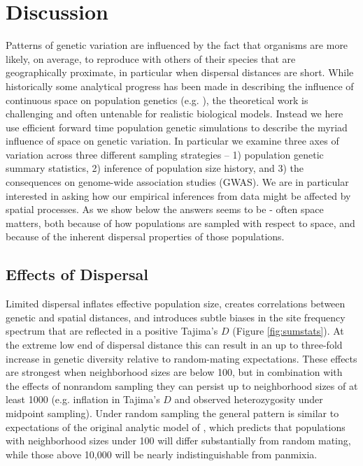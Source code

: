 \documentclass[11pt,twoside,lineno]{preprint}
\begin{document}
\section{Discussion}
Patterns of genetic variation are influenced by the fact that organisms are more likely, on average, to reproduce with others of their species that are geographically proximate, in particular when dispersal distances are short. While historically some analytical progress has been made in describing the influence of continuous space on population genetics (e.g. \cite{Wright1943,Rousset1997,Ringbauer2017,Barton2010}), the theoretical work is challenging and often untenable for realistic biological models. Instead we here use efficient forward time population genetic simulations to describe the myriad influence of space on genetic variation. In particular we examine three axes of variation across three different sampling strategies -- 1) population genetic summary statistics, 2) inference of population size history, and 3) the consequences on genome-wide association studies (GWAS). We are in particular interested in asking how our empirical inferences from data might be affected by spatial processes. As we show below the answers seems to be - often space matters, both because of how populations are sampled with respect to space, and because of the inherent dispersal properties of those populations. 

\subsection{Effects of Dispersal}
Limited dispersal inflates effective population size, creates correlations between genetic and spatial distances, and introduces subtle biases in the site frequency spectrum that are reflected in a positive Tajima's $D$ (Figure \ref{fig:sumstats}). At the extreme low end of dispersal distance this can result in an up to three-fold increase in genetic diversity relative to random-mating expectations. These effects are strongest when neighborhood sizes are below 100, but in combination with the effects of nonrandom sampling they can persist up to neighborhood sizes of at least 1000 (e.g. inflation in Tajima's $D$ and observed heterozygosity under midpoint sampling). Under random sampling the general pattern is similar to expectations of the original analytic model of \cite{Wright1943}, which predicts that populations with neighborhood sizes under 100 will differ substantially from random mating, while those above 10,000 will be nearly indistinguishable from panmixia. 
\end{document}

